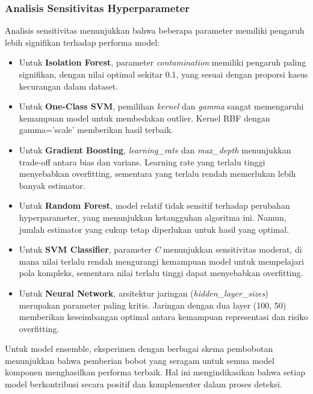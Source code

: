 \subsubsection{Analisis Sensitivitas Hyperparameter}

Analisis sensitivitas menunjukkan bahwa beberapa parameter memiliki pengaruh lebih signifikan terhadap performa model:

\begin{itemize}
    \item Untuk \textbf{Isolation Forest}, parameter \textit{contamination} memiliki pengaruh paling signifikan, dengan nilai optimal sekitar 0.1, yang sesuai dengan proporsi kasus kecurangan dalam dataset.
    
    \item Untuk \textbf{One-Class SVM}, pemilihan \textit{kernel} dan \textit{gamma} sangat memengaruhi kemampuan model untuk membedakan outlier. Kernel RBF dengan gamma='scale' memberikan hasil terbaik.
    
    \item Untuk \textbf{Gradient Boosting}, \textit{learning\_rate} dan \textit{max\_depth} menunjukkan trade-off antara bias dan varians. Learning rate yang terlalu tinggi menyebabkan overfitting, sementara yang terlalu rendah memerlukan lebih banyak estimator.
    
    \item Untuk \textbf{Random Forest}, model relatif tidak sensitif terhadap perubahan hyperparameter, yang menunjukkan ketangguhan algoritma ini. Namun, jumlah estimator yang cukup tetap diperlukan untuk hasil yang optimal.
    
    \item Untuk \textbf{SVM Classifier}, parameter \textit{C} menunjukkan sensitivitas moderat, di mana nilai terlalu rendah mengurangi kemampuan model untuk mempelajari pola kompleks, sementara nilai terlalu tinggi dapat menyebabkan overfitting.
    
    \item Untuk \textbf{Neural Network}, arsitektur jaringan (\textit{hidden\_layer\_sizes}) merupakan parameter paling kritis. Jaringan dengan dua layer (100, 50) memberikan keseimbangan optimal antara kemampuan representasi dan risiko overfitting.
\end{itemize}

Untuk model ensemble, eksperimen dengan berbagai skema pembobotan menunjukkan bahwa pemberian bobot yang seragam untuk semua model komponen menghasilkan performa terbaik. Hal ini mengindikasikan bahwa setiap model berkontribusi secara positif dan komplementer dalam proses deteksi.

